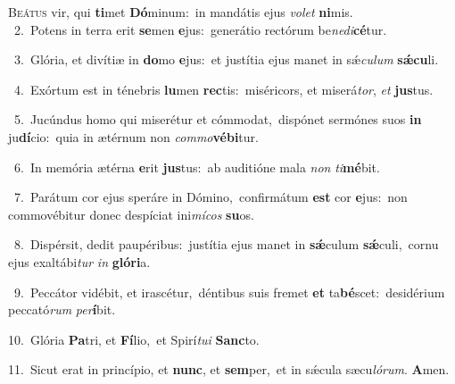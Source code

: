 \lettrine{\initial\textcolor{\initialcolor}{B}}{eátus} vir, qui \textbf{ti}\-met \textbf{Dó}\-minum:~\star in mandátis ejus \textit{vo}\-\textit{let} \textbf{ni}\-mis.\\
{\numbfont\textcolor{\numbcolor}{~2.}}~Potens in terra erit \textbf{se}\-men \textbf{e}\-jus:~\star generátio rectórum be\-\textit{ne}\-\textit{di}\textbf{cé}tur.\par
{\numbfont\textcolor{\numbcolor}{~3.}}~Glória, et divítiæ in \textbf{do}\-mo \textbf{e}\-jus:~\star et justítia ejus manet in sǽ\-\textit{cu}\-\textit{lum} \textbf{sǽ}\-\textbf{cu}li.\par
{\numbfont\textcolor{\numbcolor}{~4.}}~Exórtum est in ténebris \textbf{lu}\-men \textbf{rec}\-tis:~\star miséricors, et miserá\-\textit{tor}\-, \textit{et} \textbf{jus}\-tus.\par
{\numbfont\textcolor{\numbcolor}{~5.}}~Jucúndus homo qui miserétur et cómmodat,~\dagger dispónet sermónes suos \textbf{in} ju\-\textbf{dí}\-cio:~\star quia in ætérnum non \textit{com}\-\textit{mo}\textbf{vé}\textbf{bi}tur.\par
{\numbfont\textcolor{\numbcolor}{~6.}}~In memória ætérna \textbf{e}\-rit \textbf{jus}\-tus:~\star ab auditióne mala \textit{non} \textit{ti}\-\textbf{mé}bit.\par
{\numbfont\textcolor{\numbcolor}{~7.}}~Parátum cor ejus speráre in Dómino,~\dagger confirmátum \textbf{est} cor \textbf{e}\-jus:~\star non commovébitur donec despíciat ini\-\textit{mí}\-\textit{cos} \textbf{su}\-os.\par
{\numbfont\textcolor{\numbcolor}{~8.}}~Dispérsit, dedit paupéribus:~\dagger justítia ejus manet in \textbf{sǽ}\-culum \textbf{sǽ}\-culi,~\star cornu ejus exaltábi\textit{tur} \textit{in} \textbf{gló}\-\textbf{ri}a.\par
{\numbfont\textcolor{\numbcolor}{~9.}}~Peccátor vidébit, et irascétur,~\dagger déntibus suis fremet \textbf{et} ta\-\textbf{bé}\-scet:~\star desidérium peccató\textit{rum} \textit{per}\-\textbf{í}bit.\par
{\numbfont\textcolor{\numbcolor}{10.}}~Glória \textbf{Pa}\-tri, et \textbf{Fí}\-lio,~\star et Spirí\-\textit{tu}\-\textit{i} \textbf{Sanc}\-to.\par
{\numbfont\textcolor{\numbcolor}{11.}}~Sicut erat in princípio, et \textbf{nunc}\-, et \textbf{sem}\-per,~\star et in sǽcula sæcu\-\textit{ló}\-\textit{rum}. \textbf{A}\-men.\par
